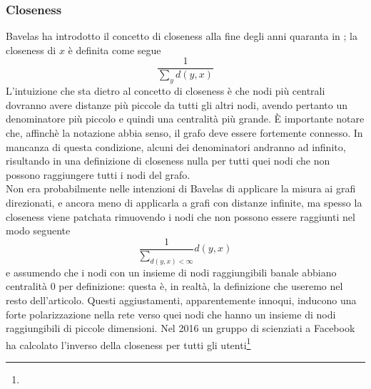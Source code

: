 \subsubsection{Closeness}
Bavelas ha introdotto il concetto di closeness alla fine degli anni quaranta in %
; la closeness di $x$ è definita come segue
\begin{equation}
    \frac{1}{\sum_y{d(y, x)}}
\end{equation}
L'intuizione che sta dietro al concetto di closeness è che nodi più centrali dovranno avere distanze più piccole da tutti gli altri nodi, avendo pertanto un denominatore più piccolo e quindi una centralità più grande. È importante notare che, affinchè la notazione abbia senso, il grafo deve essere fortemente connesso. In mancanza di questa condizione, alcuni dei denominatori andranno ad infinito, risultando in una definizione di closeness nulla per tutti quei nodi che non possono raggiungere tutti i nodi del grafo.\\
Non era probabilmente nelle intenzioni di Bavelas di applicare la misura ai grafi direzionati, e ancora meno di applicarla a grafi con distanze infinite, ma spesso la closeness viene patchata rimuovendo i nodi che non possono essere raggiunti nel modo seguente
\begin{equation*}
    \frac{1}{\sum_{d(y, x) < \infty}}{d(y, x)}
\end{equation*}
e assumendo che i nodi con un insieme di nodi raggiungibili banale abbiano centralità 0 per definizione: questa è, in realtà, la definizione che useremo nel resto dell'articolo. Questi aggiustamenti, apparentemente innoqui, inducono una forte polarizzazione nella rete verso quei nodi che hanno un insieme di nodi raggiungibili di piccole dimensioni. Nel 2016 un gruppo di scienziati a Facebook ha calcolato l'inverso della closeness per tutti gli utenti\footnote{%
}
